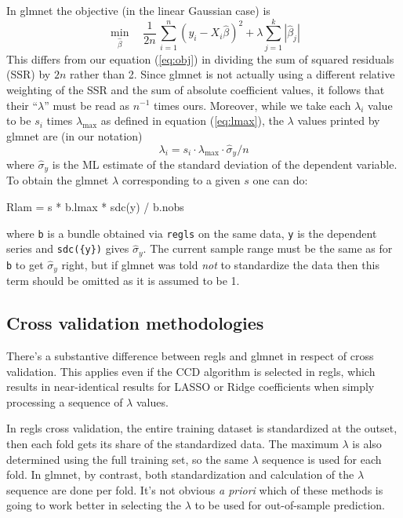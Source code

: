 \documentclass{article}
\begin{document}
In \textsf{glmnet} the objective (in the linear Gaussian case) is
\[
   \min_{\hat{\beta}} \quad \frac{1}{2n}\,
  \sum_{i=1}^n (y_i - X_i\hat{\beta})^2 + \lambda \sum_{j=1}^k |\hat{\beta}_j|
\]
This differs from our equation (\ref{eq:obj}) in dividing the sum of
squared residuals (SSR) by $2n$ rather than 2. Since \textsf{glmnet}
is not actually using a different relative weighting of the SSR and
the sum of absolute coefficient values, it follows that their
``$\lambda$'' must be read as $n^{-1}$ times ours. Moreover, while we
take each $\lambda_i$ value to be $s_i$ times $\lambda_{\max}$ as
defined in equation (\ref{eq:lmax}), the $\lambda$ values printed by
\textsf{glmnet} are (in our notation)
\[
\lambda_i = s_i \cdot \lambda_{\max} \cdot \hat{\sigma}_y / n
\]
where $\hat{\sigma}_y$ is the ML estimate of the standard deviation of
the dependent variable. To obtain the \textsf{glmnet} $\lambda$
corresponding to a given $s$ one can do:
\begin{code}
Rlam = s * b.lmax * sdc({y}) / b.nobs
\end{code}
where \texttt{b} is a bundle obtained via \texttt{regls} on the same
data, \texttt{y} is the dependent series and \texttt{sdc(\{y\})} gives
$\hat{\sigma}_y$. The current sample range must be the same as for
\texttt{b} to get $\hat{\sigma}_y$ right, but if \textsf{glmnet} was
told \textit{not} to standardize the data then this term should be
omitted as it is assumed to be 1.

\subsection*{Cross validation methodologies}

There's a substantive difference between \textsf{regls} and
\textsf{glmnet} in respect of cross validation. This applies even if
the CCD algorithm is selected in \textsf{regls}, which results in
near-identical results for LASSO or Ridge coefficients when simply
processing a sequence of $\lambda$ values.

In \textsf{regls} cross validation, the entire training dataset is
standardized at the outset, then each fold gets its share of the
standardized data. The maximum $\lambda$ is also determined using the
full training set, so the same $\lambda$ sequence is used for each
fold. In \textsf{glmnet}, by contrast, both standardization and
calculation of the $\lambda$ sequence are done per fold. It's not
obvious \textit{a priori} which of these methods is going to work
better in selecting the $\lambda$ to be used for out-of-sample
prediction.
\end{document}
